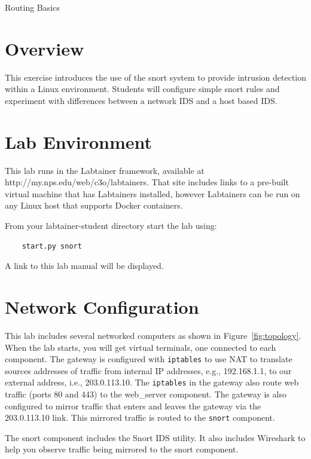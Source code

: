 


\begin{center}
{\LARGE Routing Basics}
\vspace{0.1in}\\
\end{center}

\copyrightnotice

\section{Overview}
This exercise introduces the use of the snort system
to provide intrusion detection within a
Linux environment.  Students will configure simple 
snort rules and experiment with differences between
a network IDS and a host based IDS.  


\section{Lab Environment}
This lab runs in the Labtainer framework,
available at http://my.nps.edu/web/c3o/labtainers.
That site includes links to a pre-built virtual machine
that has Labtainers installed, however Labtainers can
be run on any Linux host that supports Docker containers.

From your labtainer-student directory start the lab using:
\begin{verbatim}
    start.py snort
\end{verbatim}
\noindent A link to this lab manual will be displayed.  

\section{Network Configuration}
This lab includes several networked computers as shown in Figure~\ref{fig:topology}.
When the lab starts, you will get virtual terminals, one connected to each
component.  The gateway is configured with {\tt iptables} to use NAT to translate
sources addresses of traffic from internal IP addresses, e.g., 192.168.1.1, to
our external address, i.e., 203.0.113.10.  The {\tt iptables} in the gateway also
route web traffic (ports 80 and 443) to the web\_server component.
The gateway is also configured to 
mirror traffic that enters and leaves the gateway via the 203.0.113.10 link.  This
mirrored traffic is routed to the {\tt snort} component.  

The snort component includes the Snort IDS utility.  It also includes Wireshark
to help you observe traffic being mirrored to the snort component.

